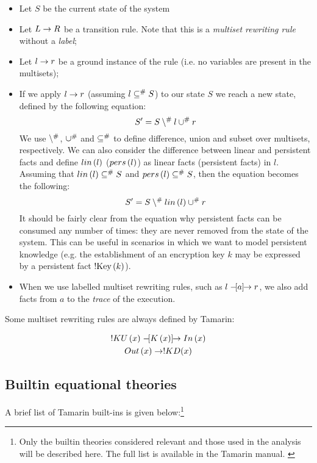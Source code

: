 \begin{itemize}
    \item{Let $S$ be the current state of the system}
    \item{Let $L \rightarrow R$ be a transition rule. Note that this is a \textit{multiset rewriting rule} without a \textit{label};}
    \item{Let $l \rightarrow r$ be a ground instance of the rule (i.e. no variables are present in the multisets);}
    \item{If we apply $l \rightarrow r$ (assuming $l \subseteq^\# S$) to our state $S$ we reach a new state, defined by the following equation:
    \begin{equation}
        S' = S \setminus^\# l \cup^\# r
    \end{equation}
    We use $\setminus^\#$, $\cup^\#$ and $\subseteq^\#$ to define difference, union and subset over multisets, respectively. We can also consider the difference between linear and persistent facts and define $lin\left(l\right)$ ($pers\left(l\right)$) as linear facts (persistent facts) in $l$. Assuming that $lin\left(l\right) \subseteq^\# S$ and $pers\left(l\right) \subseteq^\# S$, then the equation becomes the following:
    \begin{equation}
        S' = S \setminus^\# lin\left(l\right) \cup^\# r
    \end{equation}
    It should be fairly clear from the equation why persistent facts can be consumed any number of times: they are never removed from the state of the system. This can be useful in scenarios in which we want to model persistent knowledge (e.g. the establishment of an encryption key $k$ may be expressed by a persistent fact $\mbox{!Key}\left(k\right)$).
    }
    \item{When we use labelled multiset rewriting rules, such as $l \mathrel{-\hspace{-2pt}[a]\hspace{-4pt}\to} r$, we also add facts from $a$ to the \textit{trace} of the execution.}
\end{itemize}

Some multiset rewriting rules are always defined by Tamarin:

\begin{equation}
\begin{gathered}
    !KU\left(x\right) \mathrel{-\hspace{-2pt}[K\left(x\right)]\hspace{-4pt}\to} In\left(x\right)\\
    Out\left(x\right) \rightarrow !KD(x)
\end{gathered}
\end{equation}


\subsection{Builtin equational theories}
\label{sub:Builtin-equational-theories}
A brief list of Tamarin built-ins is given below:\footnote{Only the builtin theories considered relevant and those used in the analysis will be described here. The full list is available in the Tamarin manual. \cite{TamarinProverManual}}

